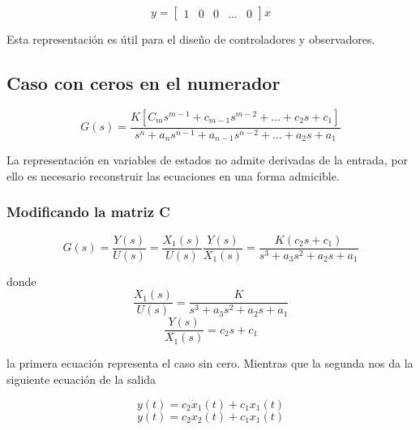 \documentclass[legalpaper,twocolumn]{article}
\begin{document}
\[
    y = \begin{bmatrix}
        1 & 0 & 0 & \dots & 0
    \end{bmatrix} x
\]

Esta representación es útil para el diseño de controladores y observadores.

\subsection*{Caso con ceros en el numerador}

\[G(s) = \frac{K[C_m s^{m-1} + c_{m-1} s^{m-2} + \dots + c_2 s + c_1]}{s^n + a_n s^{n-1} + a_{n-1} s^{n-2} + \dots + a_2 s + a_1}\]

La representación en variables de estados no admite derivadas de la entrada, por ello es necesario reconstruir las ecuaciones en una forma admicible.

\subsubsection{Modificando la matriz C}
\[
    G(s) = \frac{Y(s)}{U(s)} = \frac{X_1(s)}{U(s)} \frac{Y(s)}{X_1(s)} = \frac{K(c_2 s + c_1)}{s^3 + a_3 s^2 + a_2 s + a_1}
\]

donde
\[
    \frac{X_1(s)}{U(s)} = \frac{K}{s^3 + a_3 s^2 + a_2 s + a_1}
\]
\[
    \frac{Y(s)}{X_1(s)} = c_2 s + c_1
\]

la primera ecuación representa el caso sin cero. Mientras que la segunda nos da la siguiente ecuación de la salida

$$
    y(t)  = c_2 \dot{x}_1(t) + c_1 x_1(t)
$$
$$
    y(t)  = c_2 x_2(t) + c_1 x_1(t)
$$
\end{document}
